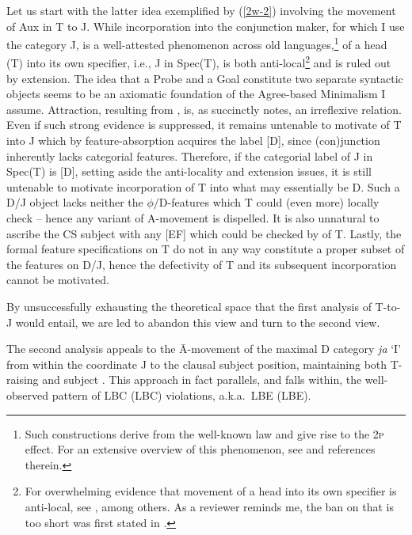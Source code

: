 \documentclass[output=paper]{langsci/langscibook}
\begin{document}
Let us start with the latter idea exemplified by (\ref{2w-2}) involving the
movement of Aux in  T to J. While
incorporation into the conjunction maker, for which I use the category
J, is a well-attested phenomenon across old 
languages,\footnote{Such constructions derive from the well-known
 law and give rise to the \textsc{2p} effect. For
an extensive overview of this phenomenon, see \citet{Mitrovic:2014phd} and
references therein.}  of a head (T) into its own
specifier, i.e., J in Spec(T), is both
anti-local\footnote{\label{anti-loc}For overwhelming evidence that movement of
    a head into its own specifier is anti-local, see
    \citet{SaitoKeiko:1999,Abels:2003a,Grohmann:2003a,Doggett:2004,Boskovic:2005,Boeckx:2007b},
among others. As a reviewer reminds me, the ban on  that is too
short was first stated in \citet{Boskovic:1994}.} and is ruled out by
extension. The idea that a Probe and a Goal constitute two separate syntactic
objects seems to be an axiomatic foundation of the Agree-based Minimalism I
assume. Attraction, resulting from , is, as
\citet[397]{roberts:2012uq} succinctly notes, an irreflexive relation. Even if
such strong evidence is suppressed, it remains untenable to motivate
 of T into J which by feature-absorption
acquires the label [D], since (con)junction inherently lacks categorial
features. Therefore, if the categorial label of J in Spec(T)
is [D], setting aside the anti-locality and extension issues, it is still
untenable to motivate incorporation of T into what may essentially be
D.  Such a D/J object lacks neither the
$\phi/$D-features which T could (even more) locally
check -- hence any variant of A-movement is dispelled. It is also unnatural to
ascribe the CS subject with any [\gls{EF}] which could be checked by
 of T. Lastly, the formal feature specifications on
T do not in any way constitute a proper subset of the features on
D/J, hence the defectivity of T and its subsequent
incorporation cannot be motivated.

By unsuccessfully exhausting the theoretical space that the first analysis of
T-to-J  would entail, we are led to abandon this view and turn to
the second view.

The second analysis appeals to the Ā-movement of the maximal D category
\emph{ja} `I' from within the coordinate J to the
clausal subject position, maintaining both T-raising and subject . This
approach in fact parallels, and falls within, the well-observed pattern of
\glsdesc{LBC} (\gls{LBC}) violations, a.k.a.\ \glsdesc{LBE} (\gls{LBE}).
\end{document}
